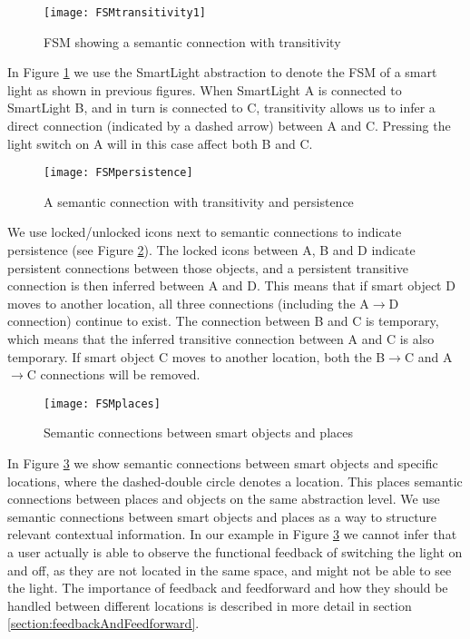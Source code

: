 \begin{figure}
\centerline{\texttt{[image: FSMtransitivity1]}}
\caption{FSM showing a semantic connection with transitivity}
\label{FSMtransitivity}
\end{figure}

In Figure \ref{FSMtransitivity} we use the SmartLight abstraction to denote the FSM of a smart light as shown in previous figures. When SmartLight A is connected to SmartLight B, and in turn is connected to C, transitivity allows us to infer a direct connection (indicated by a dashed arrow) between A and C. Pressing the light switch on A will in this case affect both B and C.

\begin{figure}
\centerline{\texttt{[image: FSMpersistence]}}
\caption{A semantic connection with transitivity and persistence}
\label{FSMpersistence}
\end{figure}

We use locked/unlocked icons next to semantic connections to indicate persistence (see Figure \ref{FSMpersistence}). The locked icons between A, B and D indicate persistent connections between those objects, and a persistent transitive connection is then inferred between A and D. This means that if smart object D moves to another location, all three connections (including the A$\rightarrow$D connection) continue to exist. The connection between B and C is temporary, which means that the inferred transitive connection between A and C is also temporary. If smart object C moves to another location, both the B$\rightarrow$C and A$\rightarrow$C connections will be removed.

\begin{figure}
\centerline{\texttt{[image: FSMplaces]}}
\caption{Semantic connections between smart objects and places}
\label{FSMplaces}
\end{figure}

In Figure \ref{FSMplaces} we show semantic connections between smart objects and specific locations, where the dashed-double circle denotes a location. This places semantic connections between places and objects on the same abstraction level. We use semantic connections between smart objects and places as a way to structure relevant contextual information. In our example in Figure \ref{FSMplaces} we cannot infer that a user actually is able to observe the functional feedback of switching the light on and off, as they are not located in the same space, and might not be able to see the light. The importance of feedback and feedforward and how they should be handled between different locations is described in more detail in section \ref{section:feedbackAndFeedforward}.

